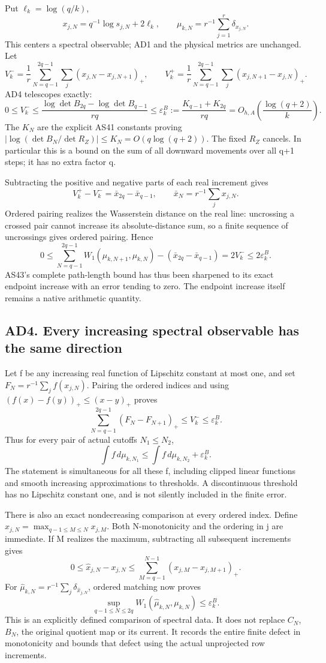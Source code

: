 \documentclass[11pt]{article}
\begin{document}
Put \(\ell_k=\log(q/k)\), \[
x_{j,N}=q^{-1}\log s_{j,N}+2\ell_k,
\qquad \mu_{k,N}=r^{-1}\sum_{j=1}^r\delta_{x_{j,N}}.
\tag{AD5}
\] This centers a spectral observable; AD1 and the physical metrics are unchanged. Let \[
V_k^-=\frac1r\sum_{N=q-1}^{2q-1}\sum_j
(x_{j,N}-x_{j,N+1})_+,\qquad
V_k^+=\frac1r\sum_{N=q-1}^{2q-1}\sum_j
(x_{j,N+1}-x_{j,N})_+.
\] AD4 telescopes exactly: \[
0\le V_k^-\le\frac{\log\det B_{2q}-\log\det B_{q-1}}{rq}
\le\varepsilon_k^B:=\frac{K_{q-1}+K_{2q}}{rq}
=O_{h,A}\!\left(\frac{\log(q+2)}k\right).
\tag{AD6}
\] The \(K_N\) are the explicit AS41 constants proving \(|\log(\det B_N/\det R_Z)|\le K_N=O(q\log(q+2))\). The fixed \(R_Z\) cancels. In particular this is a bound on the sum of all downward movements over all q+1 steps; it has no extra factor q.

Subtracting the positive and negative parts of each real increment gives \[
V_k^+-V_k^-=\bar x_{2q}-\bar x_{q-1},\qquad
\bar x_N=r^{-1}\sum_jx_{j,N}.
\tag{AD7}
\] Ordered pairing realizes the Wasserstein distance on the real line: uncrossing a crossed pair cannot increase its absolute-distance sum, so a finite sequence of uncrossings gives ordered pairing. Hence \[
0\le
\sum_{N=q-1}^{2q-1}W_1(\mu_{k,N+1},\mu_{k,N})
-(\bar x_{2q}-\bar x_{q-1})
=2V_k^-\le2\varepsilon_k^B.
\tag{AD8}
\] AS43's complete path-length bound has thus been sharpened to its exact endpoint increase with an error tending to zero. The endpoint increase itself remains a native arithmetic quantity.

\subsection{AD4. Every increasing spectral observable has the same direction}\label{ad4.-every-increasing-spectral-observable-has-the-same-direction}

Let f be any increasing real function of Lipschitz constant at most one, and set \(F_N=r^{-1}\sum_j f(x_{j,N})\). Pairing the ordered indices and using \((f(x)-f(y))_+\le(x-y)_+\) proves \[
\sum_{N=q-1}^{2q-1}(F_N-F_{N+1})_+
\le V_k^-\le\varepsilon_k^B.
\tag{AD9}
\] Thus for every pair of actual cutoffs \(N_1\le N_2\), \[
\int f\,d\mu_{k,N_1}\le\int f\,d\mu_{k,N_2}+\varepsilon_k^B.
\tag{AD10}
\] The statement is simultaneous for all these f, including clipped linear functions and smooth increasing approximations to thresholds. A discontinuous threshold has no Lipschitz constant one, and is not silently included in the finite error.

There is also an exact nondecreasing comparison at every ordered index. Define \(\widehat x_{j,N}=\max_{q-1\le M\le N}x_{j,M}\). Both N-monotonicity and the ordering in j are immediate. If M realizes the maximum, subtracting all subsequent increments gives \[
0\le\widehat x_{j,N}-x_{j,N}
\le\sum_{M=q-1}^{N-1}(x_{j,M}-x_{j,M+1})_+.
\] For \(\widehat\mu_{k,N}=r^{-1}\sum_j\delta_{\widehat x_{j,N}}\), ordered matching now proves \[
\sup_{q-1\le N\le2q}
W_1(\widehat\mu_{k,N},\mu_{k,N})\le\varepsilon_k^B.
\tag{AD11}
\] This is an explicitly defined comparison of spectral data. It does not replace \(C_N\), \(B_N\), the original quotient map or its current. It records the entire finite defect in monotonicity and bounds that defect using the actual unprojected row increments.
\end{document}
